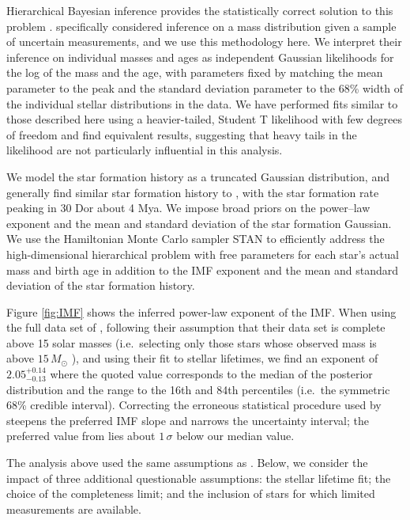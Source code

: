 \documentclass[apjl]{emulateapj}
\newcommand{\onesigrange}[3]{\ensuremath{#1^{+#2}_{-#3}}}
\newcommand{\alpharangeone}{\onesigrange{2.05}{0.14}{0.13}}
\begin{document}
Hierarchical Bayesian inference provides the statistically correct solution to
this problem \citep{Hogg:2010}.  \citet{Mandel:2010stat} specifically considered
inference on a mass distribution given a sample of uncertain measurements, and
we use this methodology here.  We interpret their inference
on individual masses and ages as independent Gaussian likelihoods for the log
of the mass and the age, with parameters fixed by matching the mean parameter to the peak and the standard deviation parameter to the 68\% width of the
individual stellar distributions in the \citet{Schneider:2018} data.  We have performed fits similar to those described here using a heavier-tailed, Student T likelihood with few degrees of freedom and find equivalent results, suggesting that heavy tails in the likelihood are not particularly influential in this analysis.

We model the star formation history as a truncated Gaussian distribution, and
generally find similar star formation history to \citet{Schneider:2018}, with
the star formation rate peaking in 30 Dor about 4 Mya.  We impose broad priors
on the power--law exponent and the mean and standard deviation of the star
formation Gaussian.    We use the Hamiltonian Monte Carlo sampler STAN
\citep{STAN} to efficiently address the high-dimensional hierarchical problem
with free parameters for each star's actual mass and birth age in addition to
the IMF exponent and the mean and standard deviation of the star formation
history.

Figure \ref{fig:IMF} shows the inferred power-law exponent of the IMF.   When
using the full data set of \citet{Schneider:2018}, following their assumption
that their data set is complete above 15 solar masses (i.e.\ selecting only
those stars whose observed mass is above $15 \, M_\odot$
\citep{Loredo:2004,BBH:O1}), and using their fit to stellar lifetimes, we find
an exponent of $\alpharangeone$ where the quoted value corresponds to the median
of the posterior distribution and the range to the 16th and 84th percentiles
(i.e.\ the symmetric 68\% credible interval).  Correcting the erroneous
statistical procedure used by \citet{Schneider:2018} steepens the preferred IMF
slope and narrows the uncertainty interval; the preferred value from
\citet{Schneider:2018} lies about $1\, \sigma$ below our median value.

The analysis above used the same assumptions as \citet{Schneider:2018}.  Below, we consider the impact of three additional questionable assumptions: the stellar lifetime fit; the choice of the completeness limit; and the inclusion of stars for which limited measurements are available.
\end{document}
